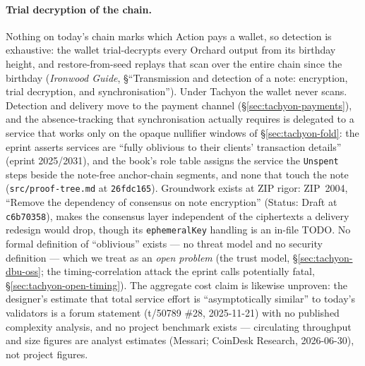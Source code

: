 \documentclass[11pt,a4paper]{article}
\theoremstyle{definition}
\begin{document}
\paragraph{Trial decryption of the chain.} Nothing on today's chain marks
which Action pays a wallet, so detection is exhaustive: the wallet
trial-decrypts every Orchard output from its birthday height, and
restore-from-seed replays that scan over the entire chain since the birthday
(\emph{Ironwood Guide}, \S``Transmission and detection of a note: encryption,
trial decryption, and synchronisation''). Under Tachyon the wallet never
scans. Detection and delivery move to the payment channel
(\S\ref{sec:tachyon-payments}), and the absence-tracking that
synchronisation actually requires is delegated to a service that works only
on the opaque nullifier windows of \S\ref{sec:tachyon-fold}: the eprint
asserts services are ``fully oblivious to their clients' transaction
details'' (eprint 2025/2031), and the book's role table assigns the service
the \texttt{Unspent} steps beside the note-free anchor-chain segments, and
none that touch the note (\texttt{src/proof-tree.md} at \texttt{26fdc165}).
Groundwork exists at ZIP
rigor: ZIP~2004, ``Remove the dependency of consensus on note encryption''
(Status: Draft at \texttt{c6b70358}), makes the consensus layer independent
of the ciphertexts a delivery redesign would drop, though its
\texttt{ephemeralKey} handling is an in-file TODO. No formal definition of
``oblivious'' exists --- no threat model and no security definition --- which
we treat as an \emph{open problem} (the trust model,
\S\ref{sec:tachyon-dbu-oss}; the timing-correlation attack the eprint calls
potentially fatal, \S\ref{sec:tachyon-open-timing}).
The aggregate cost claim is likewise unproven: the designer's estimate that
total service effort is ``asymptotically similar'' to today's validators is
a forum statement (t/50789 \#28, 2025-11-21) with no published complexity
analysis, and no project benchmark exists --- circulating throughput and
size figures are analyst estimates (Messari; CoinDesk Research, 2026-06-30),
not project figures.
\end{document}
